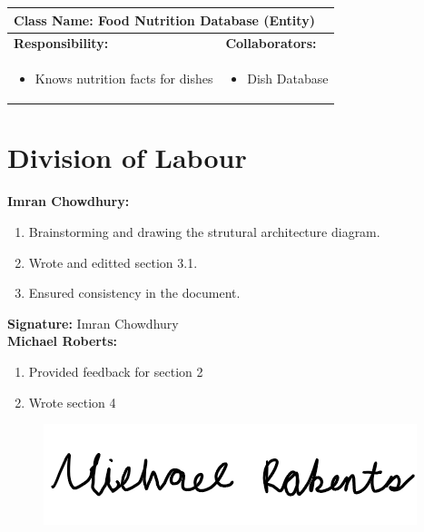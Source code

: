 \documentclass[]{article}
\begin{document}
\begin{table}[H]
	\centering
	\begin{tabular}{|p{7cm}|p{7cm}|}
	\hline 
	 \multicolumn{2}{|l|}{\textbf{Class Name:} Food Nutrition Database (Entity) }\\
	\hline
	\textbf{Responsibility:} & \textbf{Collaborators:} \\
	\hline
	\raggedright
	\begin{itemize}
		\item Knows nutrition facts for dishes
	\end{itemize}
	\vspace{1in} & 
	\begin{itemize}
		\item Dish Database
	\end{itemize} \\
	\hline
	\end{tabular}
\end{table}




\appendix
\section{Division of Labour}
\label{sec:division_of_labour}
\textbf{Imran Chowdhury:}
\begin{enumerate}
	\item Brainstorming and drawing the strutural architecture diagram.
	\item Wrote and editted section 3.1.
	\item Ensured consistency in the document.
\end{enumerate}

\textbf{Signature:} Imran Chowdhury \\

\textbf{Michael Roberts:}
\begin{enumerate}
	\item Provided feedback for section 2
	\item Wrote section 4
\end{enumerate}

\begin{figure}[H]
 	\centering
    \includegraphics[width=\textwidth]{image/A_Michael_Roberts_Signature.png}
\end{figure}
\end{document}
